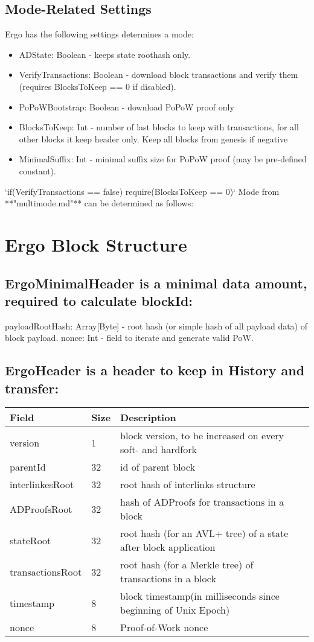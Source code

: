 \documentclass[]{report}   %
\begin{document}
\subsection{Mode-Related Settings}
Ergo has the following settings determines a mode:
\begin{itemize}
\item ADState: Boolean - keeps state roothash only.
\item VerifyTransactions: Boolean - download block transactions and verify them (requires BlocksToKeep == 0 if disabled).
\item PoPoWBootstrap: Boolean - download PoPoW proof only
\item BlocksToKeep: Int - number of last blocks to keep with transactions, for all other blocks it keep header
only. Keep all blocks from genesis if negative
\item MinimalSuffix: Int - minimal suffix size for PoPoW proof (may be pre-defined constant).
\end{itemize}
\par 
‘if(VerifyTransactions == false) require(BlocksToKeep == 0)‘ Mode from **"multimode.md"** can be determined as follows:

\section{Ergo Block Structure}
\subsection{ErgoMinimalHeader is a minimal data amount, required to calculate blockId:}
payloadRootHash: Array[Byte] - root hash (or simple hash of all payload data) of block payload.
nonce: Int - field to iterate and generate valid PoW.
\subsection{ErgoHeader is a header to keep in History and transfer:}
\vspace{1em}
\begin{tabular}{ |p{2.5cm}||p{0.5cm}|p{7.5cm}|  }
 \hline
 \hline
 Field & Size & Description  \\
 \hline
 version  &  1 &  block version, to be increased on every soft- and hardfork  \\
 \hline
 parentId &  32 &  id of parent block  \\
 \hline
 interlinkesRoot &  32 &  root hash of interlinks structure  \\
 \hline
 ADProofsRoot &  32 &  hash of ADProofs for transactions in a block \\
 \hline
 stateRoot &  32 &  root hash (for an AVL+ tree) of a state after block application  \\
 \hline
 transactionsRoot  &  32 &  root hash (for a Merkle tree) of transactions in a block  \\
 \hline
 timestamp &  8 &  block timestamp(in milliseconds since beginning of Unix Epoch)  \\
 \hline
 nonce &  8 &  Proof-of-Work nonce  \\
 \hline
\end{tabular}
\end{document}
